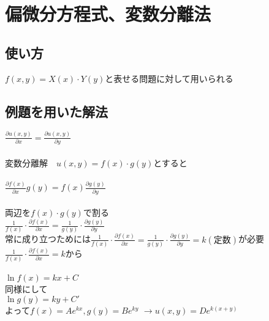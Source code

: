 \documentclass[titlepage,dvipdfmx]{jsarticle}
\begin{document}
\section{偏微分方程式、変数分離法}
  \subsection*{使い方}
    $f(x,y)=X(x)\cdot Y(y)$と表せる問題に対して用いられる

  \subsection*{例題を用いた解法}
    $\displaystyle \frac{\partial u(x,y)}{\partial x}=\frac{\partial u(x,y)}{\partial y}$\\ \\
    変数分離解　$u(x,y)=f(x)\cdot g(y)$とすると\\\\
    $\displaystyle \frac{\partial f(x)}{\partial x}g(y)=f(x)\frac{\partial g(y)}{\partial y}$\\ \\
    両辺を$f(x)\cdot g(y)$で割る\\
    $\displaystyle \frac{1}{f(x)}\cdot \frac{\partial f(x)}{\partial x}=\frac{1}{g(y)}\cdot \frac{\partial g(y)}{\partial y}$\\
    常に成り立つためには$\displaystyle \frac{1}{f(x)}\cdot \frac{\partial f(x)}{\partial x}=\frac{1}{g(y)}\cdot \frac{\partial g(y)}{\partial y}=k(定数)$が必要\\
    $\displaystyle \frac{1}{f(x)}\cdot \frac{\partial f(x)}{\partial x}=k$から\\\\
    $\displaystyle \ln f(x) =kx+C$\\
    同様にして\\
    $\displaystyle \ln g(y) =ky+C'$\\
    よって$f(x)=Ae^{kx},g(y)=Be^{ky}$
    $\rightarrow u(x,y)=De^{k(x+y)}$
\end{document}
